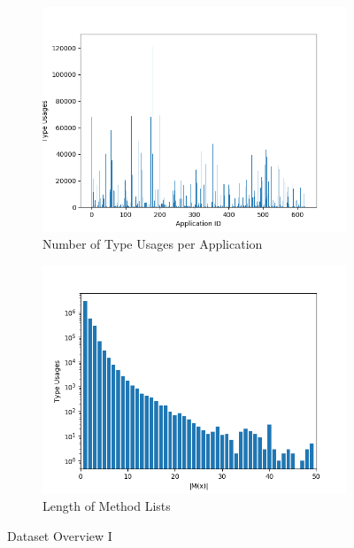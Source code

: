 \begin{figure}[t]
    \centering
    \begin{subfigure}[h]{0.49\textwidth}
        \centering
        \includegraphics[width=1.1\textwidth]{figures/graph_tus_app}
        \caption{Number of Type Usages per Application}
        \label{fig:tus_app}
    \end{subfigure}
    \begin{subfigure}[h]{0.49\textwidth}
        \centering
        \includegraphics[width=1.1\textwidth]{figures/graph_method_list}
        \caption{Length of Method Lists}
        \label{fig:method_list}
    \end{subfigure}
    \caption{Dataset Overview I}
\end{figure}

